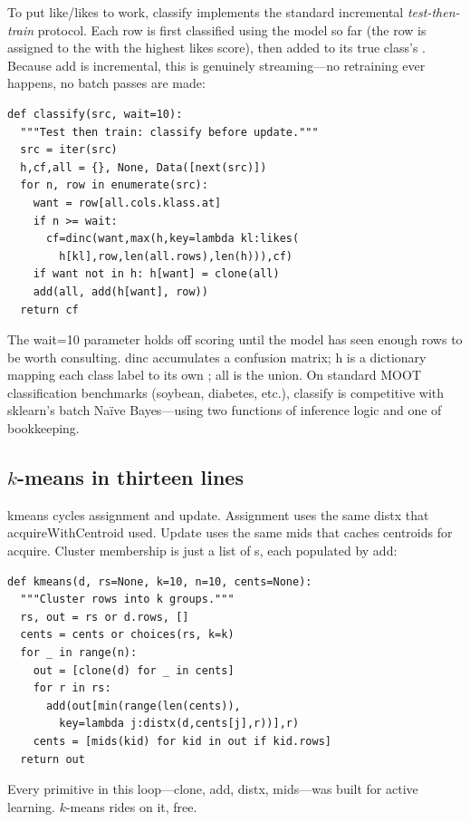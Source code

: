 {To put \textsf{like}/\textsf{likes} to work, \textsf{classify}
implements the standard incremental {\em test-then-train} protocol.
Each row is first classified using the model so far (the row is
assigned to the  with the highest \textsf{likes} score),
then added to its true class's . Because \textsf{add} is
incremental, this is genuinely streaming---no retraining ever
happens, no batch passes are made:
\begin{verbatim}
def classify(src, wait=10):
  """Test then train: classify before update."""
  src = iter(src)
  h,cf,all = {}, None, Data([next(src)])
  for n, row in enumerate(src):
    want = row[all.cols.klass.at]
    if n >= wait:
      cf=dinc(want,max(h,key=lambda kl:likes(
        h[kl],row,len(all.rows),len(h))),cf)
    if want not in h: h[want] = clone(all)
    add(all, add(h[want], row))
  return cf
\end{verbatim}
The \textsf{wait=10} parameter holds off scoring until the model
has seen enough rows to be worth consulting. \textsf{dinc}
accumulates a confusion matrix; \textsf{h} is a dictionary mapping
each class label to its own ; \textsf{all} is the union.
On standard MOOT classification benchmarks (soybean, diabetes,
etc.), \textsf{classify} is competitive with sklearn's batch Na\"ive
Bayes---using two functions of inference logic and one of
bookkeeping.

\subsection*{$k$-means in thirteen lines}

\textsf{kmeans} cycles assignment and update. Assignment uses the
same \textsf{distx} that \textsf{acquireWithCentroid} used. Update
uses the same \textsf{mids} that caches centroids for
\textsf{acquire}. Cluster membership is just a list of s,
each populated by \textsf{add}:
\begin{verbatim}
def kmeans(d, rs=None, k=10, n=10, cents=None):
  """Cluster rows into k groups."""
  rs, out = rs or d.rows, []
  cents = cents or choices(rs, k=k)
  for _ in range(n):
    out = [clone(d) for _ in cents]
    for r in rs:
      add(out[min(range(len(cents)),
        key=lambda j:distx(d,cents[j],r))],r)
    cents = [mids(kid) for kid in out if kid.rows]
  return out
\end{verbatim}
Every primitive in this loop---\textsf{clone}, \textsf{add},
\textsf{distx}, \textsf{mids}---was built for active learning.
$k$-means rides on it, free.

}
